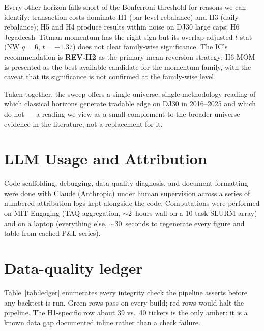 \documentclass[10pt,conference,compsoc]{IEEEtran}
\begin{document}
Every other horizon falls short of the Bonferroni threshold for
reasons we can identify: transaction costs dominate H1 (bar-level
rebalance) and H3 (daily rebalance); H5 and H4 produce results
within noise on DJ30 large caps; H6 Jegadeesh--Titman momentum
has the right sign but its overlap-adjusted $t$-stat
(NW $q{=}6$, $t = +1.37$) does not clear family-wise significance.
The IC's recommendation is \textbf{REV-H2} as the primary
mean-reversion strategy; H6 MOM is presented as the
best-available candidate for the momentum family, with the caveat
that its significance is not confirmed at the family-wise level.

Taken together, the sweep offers a single-universe,
single-methodology reading of which classical horizons generate
tradable edge on DJ30 in 2016--2025 and which do not --- a reading
we view as a small complement to the broader-universe evidence in
the literature, not a replacement for it.

\section*{LLM Usage and Attribution}

Code scaffolding, debugging, data-quality diagnosis, and document
formatting were done with Claude (Anthropic) under human 
supervision across a series of numbered
attribution logs kept alongside the code. Computations were performed on MIT
Engaging (TAQ aggregation, $\sim$2~hours wall on a 10-task SLURM
array) and on a laptop (everything else, $\sim$30~seconds to
regenerate every figure and table from cached P\&L series).

\appendix

\section{Data-quality ledger}
\label{app:ledger}

Table~\ref{tab:ledger} enumerates every integrity check the pipeline
asserts before any backtest is run. Green rows pass on every build;
red rows would halt the pipeline. The H1-specific row about 39 vs.\
40 tickers is the only amber: it is a known data gap documented
inline rather than a check failure.
\end{document}
